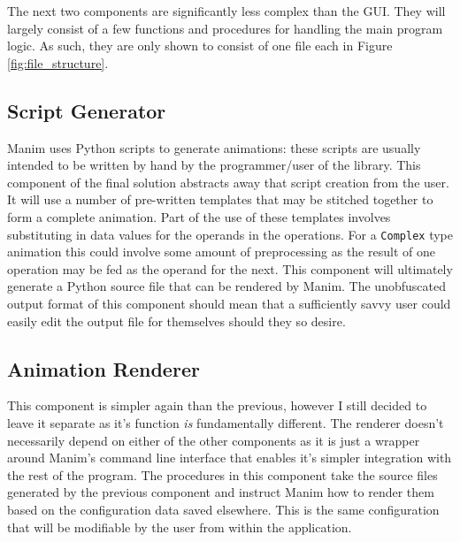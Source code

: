 \documentclass{report}
\begin{document}
\noindent\hrulefill
\vspace{3.25ex}

\noindent The next two components are significantly less complex than the GUI.
They will largely consist of a few functions and procedures for handling the
main program logic. As such, they are only shown to consist of one file each in
Figure \ref{fig:file_structure}.

\subsection{Script Generator}
Manim uses Python scripts to generate animations: these scripts are usually
intended to be written by hand by the programmer/user of the library. This
component of the final solution abstracts away that script creation from the
user. It will use a number of pre-written templates that may be stitched
together to form a complete animation. Part of the use of these templates
involves substituting in data values for the operands in the operations. For a
\texttt{Complex} type animation this could involve some amount of preprocessing
as the result of one operation may be fed as the operand for the next. This
component will ultimately generate a Python source file that can be rendered by
Manim. The unobfuscated output format of this component should mean that a
sufficiently savvy user could easily edit the output file for themselves should
they so desire.

\subsection{Animation Renderer}
This component is simpler again than the previous, however I still decided to
leave it separate as it's function \textit{is} fundamentally different. The
renderer doesn't necessarily depend on either of the other components as it is
just a wrapper around Manim's command line interface that enables it's simpler
integration with the rest of the program. The procedures in this component take
the source files generated by the previous component and instruct Manim how to
render them based on the configuration data saved elsewhere. This is the same
configuration that will be modifiable by the user from within the application.
\end{document}
